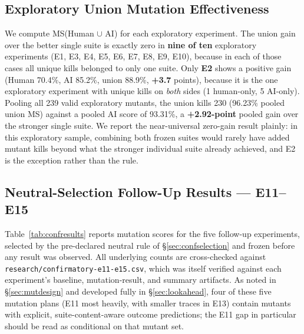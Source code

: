 \documentclass[10pt,conference]{IEEEtran}
\begin{document}
\subsection{Exploratory Union Mutation Effectiveness}
\label{sec:unionexpl}
We compute MS(Human $\cup$ AI) for each exploratory experiment. The union gain over the better single suite is exactly zero in \textbf{nine of ten} exploratory experiments (E1, E3, E4, E5, E6, E7, E8, E9, E10), because in each of those cases all unique kills belonged to only one suite. Only \textbf{E2} shows a positive gain (Human 70.4\%, AI 85.2\%, union 88.9\%, \textbf{+3.7} points), because it is the one exploratory experiment with unique kills on \emph{both} sides (1 human-only, 5 AI-only). Pooling all 239 valid exploratory mutants, the union kills 230 (96.23\% pooled union MS) against a pooled AI score of 93.31\%, a \textbf{+2.92-point} pooled gain over the stronger single suite. We report the near-universal zero-gain result plainly: in this exploratory sample, combining both frozen suites would rarely have added mutant kills beyond what the stronger individual suite already achieved, and E2 is the exception rather than the rule.

\subsection{Neutral-Selection Follow-Up Results --- E11--E15}
\label{sec:confresults}
Table~\ref{tab:confresults} reports mutation scores for the five follow-up experiments, selected by the pre-declared neutral rule of \S\ref{sec:confselection} and frozen before any result was observed. All underlying counts are cross-checked against \texttt{research/confirmatory-e11-e15.csv}, which was itself verified against each experiment's baseline, mutation-result, and summary artifacts. As noted in \S\ref{sec:mutdesign} and developed fully in \S\ref{sec:lookahead}, four of these five mutation plans (E11 most heavily, with smaller traces in E13) contain mutants with explicit, suite-content-aware outcome predictions; the E11 gap in particular should be read as conditional on that mutant set.
\end{document}
